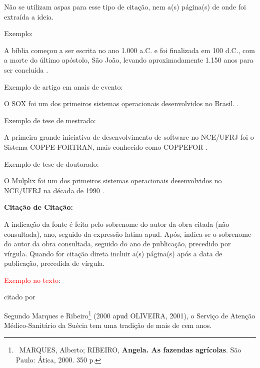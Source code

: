 
\bigskip
Não se utilizam aspas para esse tipo de citação, nem a(s) página(s) de onde foi extraída a ideia.

\bigskip
{\color{red}
Exemplo:}
\bigskip

A bíblia começou a ser escrita no ano 1.000 a.C. e foi finalizada em 100 d.C., com a morte do último apóstolo, São João, levando aproximadamente 1.150 anos para ser concluída \cite{book:GHELLER}.

\bigskip
{\color{red}
Exemplo de artigo em anais de evento:}
\bigskip

O SOX foi um dos primeiros sistemas operacionais desenvolvidos no Brasil. \cite{Sox2012}.

\bigskip

{\color{red}
Exemplo de tese de mestrado:}

\bigskip

A primeira grande iniciativa de  desenvolvimento de software no
NCE/UFRJ foi o Sistema COPPE-FORTRAN, mais conhecido
como COPPEFOR \cite{Salenbauch72}.

\bigskip
{\color{red}
Exemplo de tese de doutorado:}

\bigskip
O Mulplix foi um dos primeiros sistemas operacionais desenvolvidos no NCE/UFRJ na década de 1990 \cite{Azevedo93}.

\bigskip

{\centering\bfseries\color{red}
Citação de Citação:
\par}

\bigskip

A indicação da fonte é feita pelo sobrenome do autor da obra citada (não consultada), ano, seguido da expressão latina apud. Após, indica-se o sobrenome do autor da obra consultada, seguido do ano de publicação, precedido por vírgula. Quando for citação direta incluir a(s) página(s) após a data de publicação, precedida de vírgula.

\bigskip

{\sffamily
\textrm{\textcolor{red}{Exemplo no texto}}\textrm{:}}

\bigskip

{\sffamily
\textrm{citado por }}

\bigskip

{\sffamily
\textrm{Segundo Marques e Ribeiro}\footnote{\ MARQUES, Alberto; RIBEIRO, \textbf{Angela. As fazendas agrícolas}. São
Paulo: Ática, 2000. 350 p.}\textrm{ (2000 }\textrm{\textcolor{black}{apud }}\textrm{OLIVEIRA, 2001),  o Serviço de
Atenção Médico-Sanitário da Suécia tem uma tradição de mais de cem anos. }}


